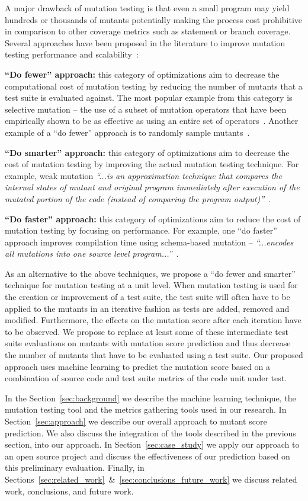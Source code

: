 \documentclass[conference]{IEEEtran}
\begin{document}
A major drawback of mutation testing is that even a small program may yield hundreds or thousands of mutants potentially making the process cost prohibitive in comparison to other coverage metrics such as statement or branch coverage. Several approaches have been proposed in the literature to improve mutation testing performance and scalability~\cite{OU00}:

\textbf{``Do fewer'' approach:} this category of optimizations aim to decrease the computational cost of mutation testing by reducing the number of mutants that a test suite is evaluated against. The most popular example from this category is selective mutation -- the use of a subset of mutation operators that have been empirically shown to be as effective as using an entire set of operators~\cite{OLR+96}. Another example of a ``do fewer'' approach is to randomly sample mutants~\cite{Won93}.

\textbf{``Do smarter'' approach:} this category of optimizations aim to decrease the cost of mutation testing by improving the actual mutation testing technique. For example, weak mutation \emph{``...is an approximation technique that compares the internal states of mutant and original program immediately after execution of the mutated portion of the code (instead of comparing the program output)''}~\cite{OU00}.

\textbf{``Do faster'' approach:} this category of optimizations aim to reduce the cost of mutation testing by focusing on performance. For example, one ``do faster'' approach improves compilation time using schema-based mutation -- \emph{``...encodes all mutations into one source level program...''}~\cite{OU00}.

As an alternative to the above techniques, we propose a ``do fewer and smarter'' technique for mutation testing at a unit level.  When mutation testing is used for the creation or improvement of a test suite,  the test suite will often have to be applied to the mutants in an iterative fashion as tests are added, removed and modified. Furthermore, the effects on the mutation score after each iteration have to be observed. We propose to replace at least some of these intermediate test suite evaluations on mutants with mutation score prediction and thus decrease the number of mutants that have to be evaluated using a test suite. Our proposed approach uses machine learning to predict the mutation score based on a combination of source code and test suite metrics of the code unit under test.

In the Section~\ref{sec:background} we describe the machine learning technique, the mutation testing tool and the metrics gathering tools used in our research. In Section~\ref{sec:approach} we describe our overall approach to mutant score prediction. We also discuss the integration of the tools described in the previous section, into our approach. In Section~\ref{sec:case_study} we apply our approach to an open source project and discuss the effectiveness of our prediction based on this preliminary evaluation. Finally, in Sections~\ref{sec:related_work}~\&~\ref{sec:conclusions_future_work} we discuss related work, conclusions, and future work.
\end{document}
